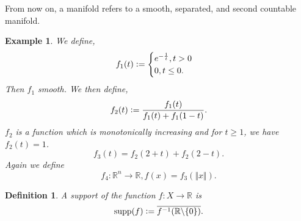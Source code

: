 \documentclass[8pt]{article}
\newtheorem{definition}{Definition}[section]
\newtheorem{example}{Example}[section]
\DeclareMathOperator{\supp}{supp}
\newcommand{\defeq}{\vcentcolon=}
\newcommand{\norm}[1]{\Vert #1 \Vert}
\newcommand{\R}[0]{\mathbb{R}}
\begin{document}
From now on, a manifold refers to a smooth, separated, and second countable manifold.
\begin{example}
  We define,
  \begin{equation*}
    f_1(t) \defeq \begin{cases}
      e^{-{\frac 1 t}}, t>0\\
      0, t\leq 0.
    \end{cases}
  \end{equation*}
  Then $f_1$ smooth. We then define,
  \begin{equation*}
    f_2(t)\defeq {\frac {f_1(t)} {f_1(t)+f_1(1-t)}}.
  \end{equation*}
  $f_2$ is a function which is monotonically increasing and for $t\geq 1$, we have $f_2(t) = 1$. 
  \begin{equation*}
    f_3(t) = f_2(2+t)+f_2(2-t).
  \end{equation*}
  Again we define
  \begin{equation*}
  f_4:\R^n\to\R, f(x) = f_3(\norm{x}).
  \end{equation*}
  \label{partition_of_unity_example}
\end{example}

\begin{definition}
  A support of the function $f:X\to\R$ is 
  \begin{equation*}
    \supp(f) \defeq \overline{f^{-1}(\R\backslash\{0\})}.
  \end{equation*} 
\end{definition}
\end{document}
